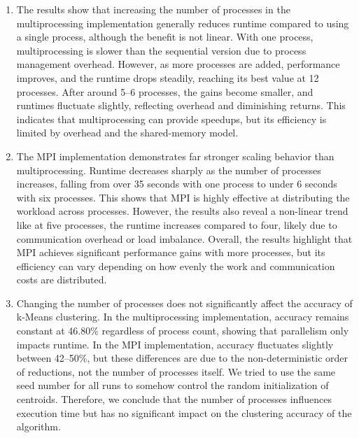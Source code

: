 \documentclass[12pt,letterpaper, onecolumn]{exam}
\begin{document}
\begin{questions}
\begin{parts}
\begin{solution}
            \begin{enumerate}[label=(\alph*)]
                \item The results show that increasing the number of processes in the multiprocessing implementation generally reduces 
                runtime compared to using a single process, although the benefit is not linear. With one process, multiprocessing is slower 
                than the sequential version due to process management overhead. However, as more processes are added, performance improves, 
                and the runtime drops steadily, reaching its best value at 12 processes. After around 5–6 processes, the gains become smaller,
                and runtimes fluctuate slightly, reflecting overhead and diminishing returns. This indicates that multiprocessing can provide 
                speedups, but its efficiency is limited by overhead and the shared-memory model.

                \item The MPI implementation demonstrates far stronger scaling behavior than multiprocessing. 
                Runtime decreases sharply as the number of processes increases, falling from over 35 seconds with one process to under 
                6 seconds with six processes. This shows that MPI is highly effective at distributing the workload across processes. 
                However, the results also reveal a non-linear trend like at five processes, the runtime increases compared to four, 
                likely due to communication overhead or load imbalance. Overall, the results highlight that MPI achieves significant 
                performance gains with more processes, but its efficiency can vary depending on how evenly the work and communication 
                costs are distributed.

                \item Changing the number of processes does not significantly affect the accuracy of k-Means clustering. 
                In the multiprocessing implementation, accuracy remains constant at 46.80\% regardless of process count, showing that parallelism 
                only impacts runtime. In the MPI implementation, accuracy fluctuates slightly between 42–50\%, but these differences are due to 
                the non-deterministic order of reductions, not the number of processes itself. We tried to use the same seed number for all runs 
                to somehow control the random initialization of centroids. Therefore, we conclude that the number of processes 
                influences execution time but has no significant impact on the clustering accuracy of the algorithm.
            \end{enumerate}


\end{solution}
\end{parts}
\end{questions}
\end{document}
